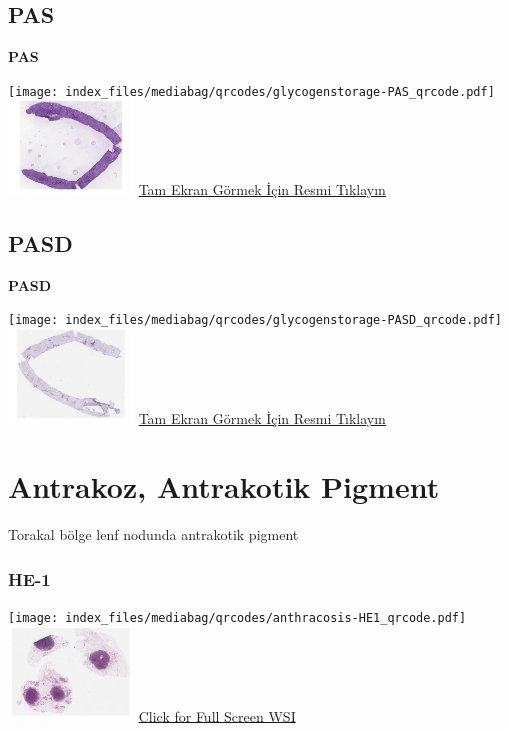 \documentclass[
  letterpaper,
  DIV=11,
  numbers=noendperiod]{scrreprt}
\begin{document}
\subsection{PAS}\label{pas}

\textbf{PAS}

\texttt{[image: index\_files/mediabag/qrcodes/glycogenstorage-PAS\_qrcode.pdf]}
\href{https://images.patolojiatlasi.com/glycogenstorage/PAS.html}{\includegraphics[width=0.25\textwidth,height=\textheight]{./screenshots/thumbnail_glycogenstorage-PAS.png}}
\href{https://images.patolojiatlasi.com/glycogenstorage/PAS.html}{Tam
Ekran Görmek İçin Resmi Tıklayın}

\subsection{PASD}\label{pasd}

\textbf{PASD}

\texttt{[image: index\_files/mediabag/qrcodes/glycogenstorage-PASD\_qrcode.pdf]}
\href{https://images.patolojiatlasi.com/glycogenstorage/PASD.html}{\includegraphics[width=0.25\textwidth,height=\textheight]{./screenshots/thumbnail_glycogenstorage-PASD.png}}
\href{https://images.patolojiatlasi.com/glycogenstorage/PASD.html}{Tam
Ekran Görmek İçin Resmi Tıklayın}

\section{Antrakoz, Antrakotik
Pigment}\label{sec-antrakoz-antrakotik-pigment}

Torakal bölge lenf nodunda antrakotik pigment

\subsubsection{HE-1}\label{he-1}

\texttt{[image: index\_files/mediabag/qrcodes/anthracosis-HE1\_qrcode.pdf]}
\href{https://images.patolojiatlasi.com/anthracosis/HE.html}{\includegraphics[width=0.25\textwidth,height=\textheight]{./screenshots/thumbnail_anthracosis1.png}}
\href{https://images.patolojiatlasi.com/anthracosis/HE.html}{Click for
Full Screen WSI}
\end{document}

